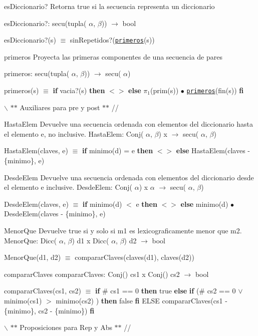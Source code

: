 \begin{DoxyParagraph}{es\-Diccionario?}
\-Retorna true si la secuencia representa un diccionario
\end{DoxyParagraph}
es\-Diccionario?\-: secu(tupla( $\alpha$, $\beta$)) $\to$ bool\par
 es\-Diccionario?(s) $\equiv$ sin\-Repetidos?(\href{axiomas.html#primeros}{\tt primeros}(s)) 

\begin{DoxyParagraph}{primeros}
\-Proyecta las primeras componentes de una secuencia de pares
\end{DoxyParagraph}
primeros\-: secu(tupla( $\alpha$, $\beta$)) $\to$ secu( $\alpha$)\par
 primeros(s) $\equiv$ {\bfseries if} vacia?(s) {\bfseries then} $<$$>$ {\bfseries else} $\pi_1$(prim(s)) $\bullet$ \href{axiomas.html#primeros}{\tt primeros}(fin(s)) {\bfseries fi} 

$\backslash$ $\ast$$\ast$ \-Auxiliares para pre y post $\ast$$\ast$ // \begin{DoxyParagraph}{\-Hasta\-Elem}
\-Devuelve una secuencia ordenada con elementos del diccionario hasta el elemento e, no inclusive. \-Hasta\-Elem\-: \-Conj( $\alpha$, $\beta$) x $\to$ secu( $\alpha$, $\beta$)\par
 \-Hasta\-Elem(claves, e) $\equiv$ {\bfseries if} minimo(d) = e {\bfseries then} $<$$>$ {\bfseries else} \-Hasta\-Elem(claves -\/ \{minimo\}, e) 
\end{DoxyParagraph}
\begin{DoxyParagraph}{\-Desde\-Elem}
\-Devuelve una secuencia ordenada con elementos del diccionario desde el elemento e inclusive. \-Desde\-Elem\-: \-Conj( $\alpha$) x $\alpha$ $\to$ secu( $\alpha$, $\beta$)\par
 \-Desde\-Elem(claves, e) $\equiv$ {\bfseries if} minimo(d) $<$ e {\bfseries then} $<$$>$ {\bfseries else} minimo(d) $\bullet$ \-Desde\-Elem(claves -\/ \{minimo\}, e) 
\end{DoxyParagraph}
\begin{DoxyParagraph}{\-Menor\-Que}
\-Devuelve true si y solo si m1 es lexicograficamente menor que m2. \-Menor\-Que\-: \-Dicc( $\alpha$, $\beta$) d1 x \-Dicc( $\alpha$, $\beta$) d2 $\to$ bool\par
 \-Menor\-Que(d1, d2) $\equiv$ comparar\-Claves(claves(d1), claves(d2)) 
\end{DoxyParagraph}
\begin{DoxyParagraph}{comparar\-Claves}
comparar\-Claves\-: \-Conj() cs1 x \-Conj() cs2 $\to$ bool\par
 comparar\-Claves(cs1, cs2) $\equiv$ {\bfseries if} \# cs1 == 0 {\bfseries then} true {\bfseries else} {\bfseries if} (\# cs2 == 0 $\lor$ minimo(cs1) $>$ minimo(cs2) ) {\bfseries then} false {\bfseries fi} \-E\-L\-S\-E comparar\-Claves(cs1 -\/ \{minimo\}, cs2 -\/ \{minimo\}) {\bfseries fi} 
\end{DoxyParagraph}
$\backslash$ $\ast$$\ast$ \-Proposiciones para \-Rep y \-Abs $\ast$$\ast$ //

